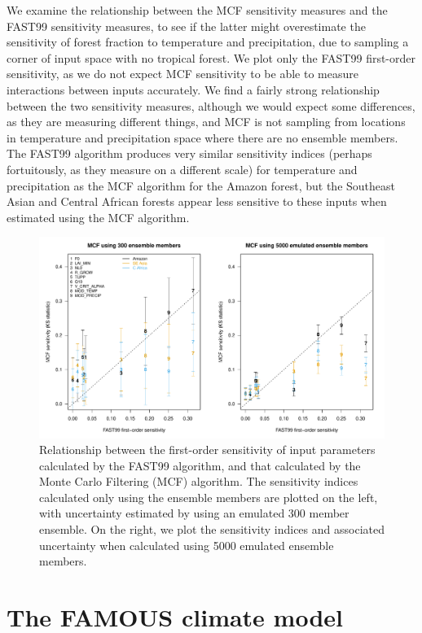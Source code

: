 \documentclass[gmd, manuscript]{copernicus} %
\begin{document}
We examine the relationship between the MCF sensitivity measures and the FAST99 sensitivity measures, to see if the latter might overestimate the sensitivity of forest fraction to temperature and precipitation, due to sampling a corner of input space with no tropical forest. We plot only the FAST99 first-order sensitivity, as we do not expect MCF sensitivity to be able to measure interactions between inputs accurately. We find a fairly strong relationship between the two sensitivity measures, although we would expect some differences, as they are measuring different things, and MCF is not sampling from locations in temperature and precipitation space where there are no ensemble members. The FAST99 algorithm produces very similar sensitivity indices (perhaps fortuitously, as they measure on a different scale) for temperature and precipitation as the MCF algorithm for the Amazon forest, but the Southeast Asian and Central African forests appear less sensitive to these inputs when estimated using the MCF algorithm.

\begin{figure}[t]
\includegraphics[width=12cm]{../graphics/fast99_vs_mcf2.pdf}
\caption{Relationship between the first-order sensitivity of input parameters calculated by the FAST99 algorithm, and that calculated by the Monte Carlo Filtering (MCF) algorithm. The sensitivity indices calculated only using the ensemble members are plotted on the left, with uncertainty estimated by using an emulated 300 member ensemble. On the right, we plot the sensitivity indices and associated uncertainty when calculated using 5000 emulated ensemble members.}
\label{fig:fast99_vs_mcf2}
\end{figure}

\section{The FAMOUS climate model}
\end{document}
